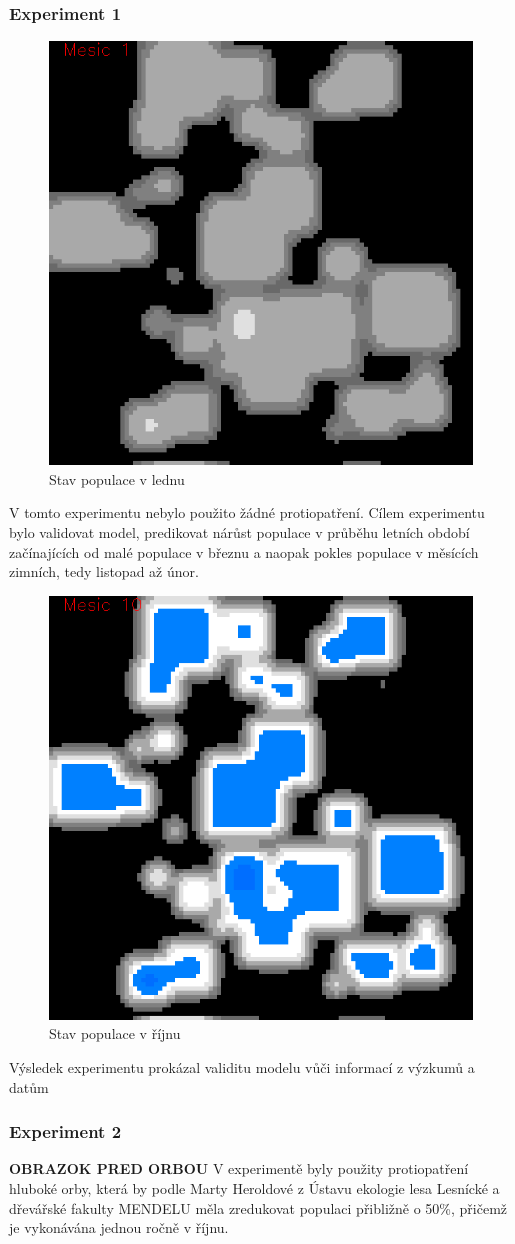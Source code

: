 \documentclass[a4paper,11pt]{article}
\begin{document}
\subsubsection{Experiment 1}
\begin{figure}[h]
\begin{center}  
    \includegraphics[width=.4\linewidth]{bez_regul1.png}
    \caption{Stav populace v lednu}
    \label{pic:exp1_obr1}
\end{center}
\end{figure}

V tomto experimentu nebylo použito žádné protiopatření. Cílem experimentu bylo validovat model, predikovat nárůst populace v průběhu letních období začínajících od malé populace v březnu a naopak pokles populace v měsících zimních, tedy listopad až únor. 

\begin{figure}[h]
\begin{center}
    \includegraphics[width=.4\linewidth]{bez_regul10.png}
    \caption{Stav populace v říjnu}
    \label{pic:exp1_obr2}
\end{center}
\end{figure}

Výsledek experimentu prokázal validitu modelu vůči informací z výzkumů \cite{fluktuace} a datům \cite{Voles-popul-data:online}
\subsubsection{Experiment 2}
\textbf{OBRAZOK PRED ORBOU}
V experimentě byly použity protiopatření hluboké orby, která by podle Marty Heroldové z Ústavu ekologie lesa Lesnícké a dřevářské fakulty MENDELU měla zredukovat populaci přibližně o 50\%, přičemž je vykonávána jednou ročně v říjnu. 
\end{document}
